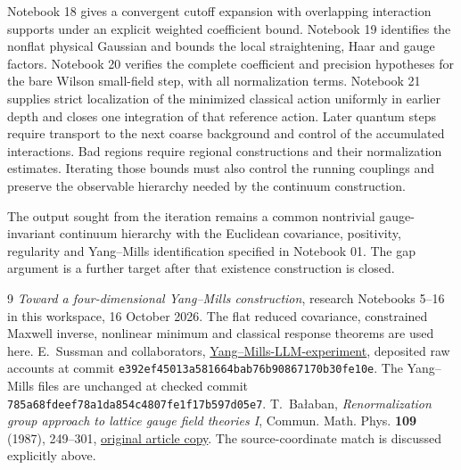 \documentclass[11pt]{article}
\theoremstyle{remark}
\begin{document}
Notebook 18 gives a convergent cutoff expansion with overlapping
interaction supports under an explicit weighted coefficient bound.
Notebook 19 identifies the nonflat physical Gaussian and bounds
the local straightening, Haar and gauge factors. Notebook 20
verifies the complete coefficient and precision hypotheses for
the bare Wilson small-field step, with all normalization terms.
Notebook 21 supplies strict localization of the minimized
classical action uniformly in earlier depth and closes one
integration of that reference action. Later quantum steps
require transport to the next coarse background and control
of the accumulated interactions. Bad regions require
regional constructions and their normalization estimates. Iterating
those bounds must also control the running couplings and preserve
the observable hierarchy needed by the continuum construction.

The output sought from the iteration remains a common nontrivial
gauge-invariant continuum hierarchy with the Euclidean covariance,
positivity, regularity and Yang--Mills identification specified in
Notebook 01. The gap argument is a further target after that
existence construction is closed.

\begin{thebibliography}{9}
\emph{Toward a four-dimensional Yang--Mills construction},
research Notebooks 5--16 in this workspace, 16 October 2026.
The flat reduced covariance, constrained Maxwell inverse,
nonlinear minimum and classical response theorems are used here.
E.~Sussman and collaborators,
\href{https://github.com/ethanwsussman/Yang--Mills-LLM-experiment}{Yang--Mills-LLM-experiment},
deposited raw accounts at commit
\texttt{e392ef45013a581664bab76b90867170b30fe10e}.
The Yang--Mills files are unchanged at checked commit
\texttt{785a68fdeef78a1da854c4807fe1f17b597d05e7}.
T.~Ba\l aban, \emph{Renormalization group approach to lattice gauge
field theories I}, Commun. Math. Phys. \textbf{109} (1987), 249--301,
\href{https://scispace.com/pdf/renormalization-group-approach-to-lattice-gauge-field-3ygai0vxt1.pdf}{original article copy}.
The source-coordinate match is discussed explicitly above.
\end{thebibliography}
\end{document}
